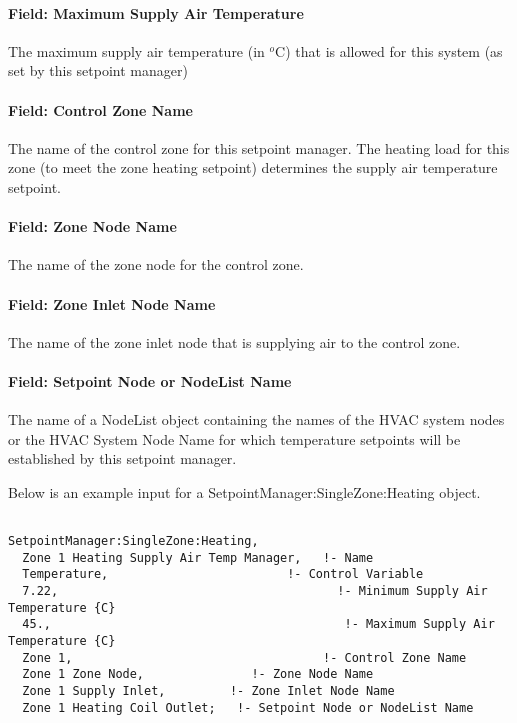 \paragraph{Field: Maximum Supply Air Temperature}\label{field-maximum-supply-air-temperature-1}

The maximum supply air temperature (in \(^{o}\)C) that is allowed for this system (as set by this setpoint manager)

\paragraph{Field: Control Zone Name}\label{field-control-zone-name-1}

The name of the control zone for this setpoint manager. The heating load for this zone (to meet the zone heating setpoint) determines the supply air temperature setpoint.

\paragraph{Field: Zone Node Name}\label{field-zone-node-name-1-000}

The name of the zone node for the control zone.

\paragraph{Field: Zone Inlet Node Name}\label{field-zone-inlet-node-name-1}

The name of the zone inlet node that is supplying air to the control zone.

\paragraph{Field: Setpoint Node or NodeList Name}\label{field-setpoint-node-or-nodelist-name-4}

The name of a NodeList object containing the names of the HVAC system nodes or the HVAC System Node Name for which temperature setpoints will be established by this setpoint manager.

Below is an example input for a SetpointManager:SingleZone:Heating object.

\begin{lstlisting}

SetpointManager:SingleZone:Heating,
  Zone 1 Heating Supply Air Temp Manager,   !- Name
  Temperature,                         !- Control Variable
  7.22,                                       !- Minimum Supply Air Temperature {C}
  45.,                                         !- Maximum Supply Air Temperature {C}
  Zone 1,                                   !- Control Zone Name
  Zone 1 Zone Node,               !- Zone Node Name
  Zone 1 Supply Inlet,         !- Zone Inlet Node Name
  Zone 1 Heating Coil Outlet;   !- Setpoint Node or NodeList Name
\end{lstlisting}

